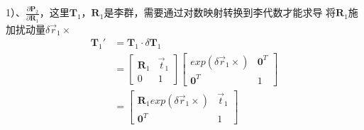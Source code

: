\documentclass{article}
\begin{document}
1）、$\frac{\partial{\boldsymbol{P}_2}}{\partial{\boldsymbol{R}_1}}$，这里$\boldsymbol{T}_1$，$\boldsymbol{R}_1$是李群，需要通过对数映射转换到李代数才能求导
将$\boldsymbol{R}_1$施加扰动量$\delta \vec{r}_1 \times$
\begin{equation}
	\begin{aligned}
		\boldsymbol{T}_1'                           & =\boldsymbol{T}_1 \cdot \delta \boldsymbol{T}_1 \\&=
		\left[ 
		\begin{matrix}  
		\boldsymbol{R}_1                            & \vec{t}_1                                       \\  
		0                                           & 1                                               
		\end{matrix}
		\right]
		\left[ 
		\begin{matrix} 
		exp(\delta \vec{r}_1\times)                 & \boldsymbol{0}^T                                \\
		\boldsymbol{0}^T                            & 1                                               
		\end{matrix}
		\right]\\&=
		\left[ 
		\begin{matrix} 
		\boldsymbol{R}_1exp(\delta \vec{r}_1\times) & \vec{t}_1                                       \\ 
		\boldsymbol{0}^T                            & 1                                               
		\end{matrix}
		\right]
	\end{aligned}
\end{equation}
\end{document}
